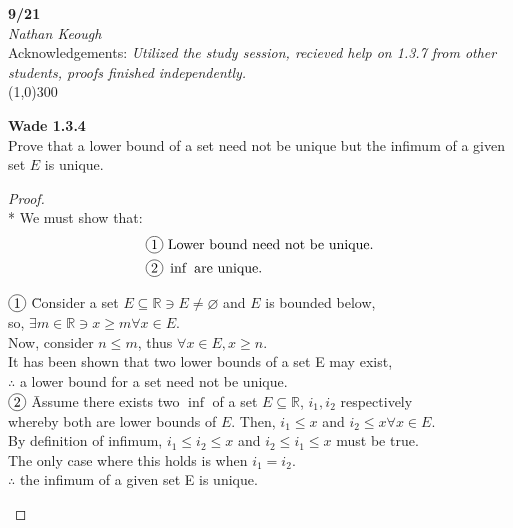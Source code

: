 \documentclass[a4paper]{article}
\newcommand{\real}{\mathbb{R}}
\newcommand{\cir}[1]{\tikz[baseline]{%
    \node[anchor=base, draw, circle, inner sep=0, minimum width=1.2em]{#1};}}
\begin{document}
    \begin{center}
        \Large \textbf{9/21} \\
        \large \textit{Nathan Keough} \\
        Acknowledgements: \emph{Utilized the study session, recieved help on 1.3.7 from other students, proofs finished independently.} \vspace{.5pc} \\ \line(1,0){300} 
        \vspace{1pc}
    \end{center} 
    
    \begin{flushleft}
        \textbf{Wade 1.3.4} \\
        Prove that a lower bound of a set need not be unique but the infimum of a given set $E$ is unique. 

            \begin{proof}\mbox{}\\*
                We must show that:\\

                \begin{align*}
                    \cir{1}& \text{ Lower bound need not be unique.} \\
                    \cir{2}& \text{ } \inf \text{ are unique.} \\
                \end{align*}
                
                \begin{tabbing}
                    $\cir{1}$ \= Consider a set $E \subseteq \real \ni E \neq \varnothing$ and $E$ is bounded below, \\
                              \> so, $\exists m \in \real \ni x \geq m \forall x \in E$. \\
                              \> Now, consider $n \leq m$, thus $\forall x\in E, x \geq n$. \\
                              \> It has been shown that two lower bounds of a set E may exist, \\
                              \> $\therefore$ a lower bound for a set need not be unique. \\

                    $\cir{2}$ \= Assume there exists two $\inf$ of a set $E \subseteq \real$, $i_1, i_2$ respectively \\
                              \> whereby both are lower bounds of $E$. Then, $i_1 \leq x$ and $i_2 \leq x \forall x\in E$. \\
                              \> By definition of infimum, $i_1 \leq i_2 \leq x$ and $i_2 \leq i_1 \leq x$ must be true. \\ 
                              \> The only case where this holds is when $i_1 = i_2$. \\
                              \> $\therefore$ the infimum of a given set E is unique.
                \end{tabbing}
                

\end{proof}
\end{flushleft}
\end{document}
